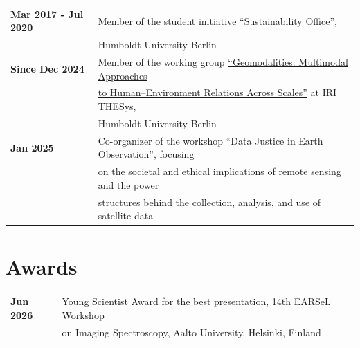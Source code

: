 \documentclass[10pt]{article} %
\begin{document}
\begin{tabular}{@{}>{\bfseries}p{3.3cm} l}
Mar 2017 - Jul 2020 & Member of the student initiative ``Sustainability Office'',\\
[0.1cm]
& Humboldt University Berlin\\
[0.2cm]
Since Dec 2024 & Member of the working group \href{https://www.iri-thesys.org/research/working-groups/}{``Geomodalities: Multimodal Approaches}\\
[0.1cm]
& \href{https://www.iri-thesys.org/research/working-groups/}{to Human--Environment Relations Across Scales''} at IRI THESys,\\
[0.1cm]
& Humboldt University Berlin\\
[0.2cm]
Jan 2025 & Co-organizer of the workshop ``Data Justice in Earth Observation'', focusing\\
[0.1cm]
& on the societal and ethical implications of remote sensing and the power\\
[0.1cm]
& structures behind the collection, analysis, and use of satellite data\\
\end{tabular}


\vspace{6mm}
\section{Awards}

\begin{tabular}{@{}>{\bfseries}p{3.3cm} l}
Jun 2026 & Young Scientist Award for the best presentation, 14th EARSeL Workshop\\
[0.1cm]
& on Imaging Spectroscopy, Aalto University, Helsinki, Finland\\
\end{tabular}

\end{document}
